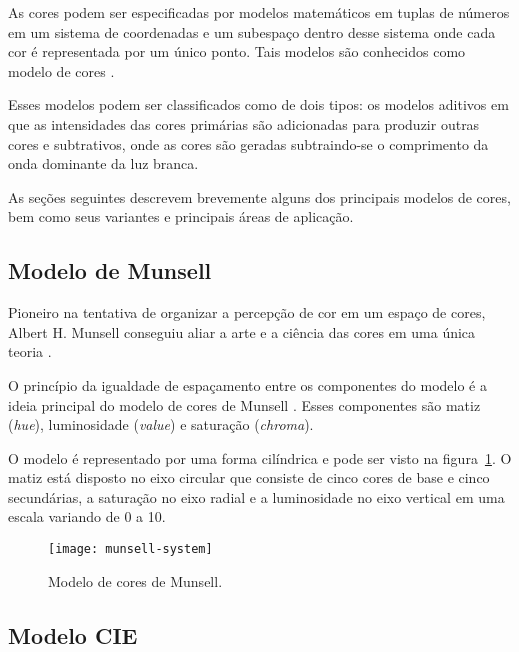 As cores podem ser especificadas por modelos matemáticos em tuplas de números em um sistema de coordenadas e um subespaço dentro desse sistema onde cada cor
é representada por um único ponto. Tais modelos são conhecidos como modelo de cores \citep{gonzalez:02}.

Esses modelos podem ser classificados como de dois tipos: os modelos aditivos em que as intensidades das cores primárias são adicionadas para produzir outras cores e subtrativos, onde as cores são geradas subtraindo-se o comprimento da onda dominante da luz branca.

As seções seguintes descrevem brevemente alguns dos principais modelos de cores, bem como seus variantes e principais áreas de aplicação.

\subsection{Modelo de Munsell}
\label{sec:modelo_cores_munsell}

Pioneiro na tentativa de organizar a percepção de cor em um espaço de cores, Albert H. Munsell conseguiu aliar a arte e a ciência das cores em uma única teoria \citep{konstantinos:00}.

O princípio da igualdade de espaçamento entre os componentes do modelo é a ideia principal do modelo de cores de Munsell \citep{konstantinos:00}. Esses componentes são matiz (\textit{hue}), luminosidade (\textit{value}) e saturação (\textit{chroma}).

O modelo é representado por uma forma cilíndrica e pode ser visto na figura~\ref{fig:munsell-system}. O matiz está disposto no eixo circular que consiste de
cinco cores de base e cinco secundárias, a saturação no eixo radial e a luminosidade no eixo vertical em uma escala variando de 0 a 10.

\begin{figure}[!h]
  \centering
  \texttt{[image: munsell-system]}
  \caption{Modelo de cores de Munsell.}
  \label{fig:munsell-system} 
\end{figure}

\subsection{Modelo CIE}
\label{sec:modelo_cores_cie}

